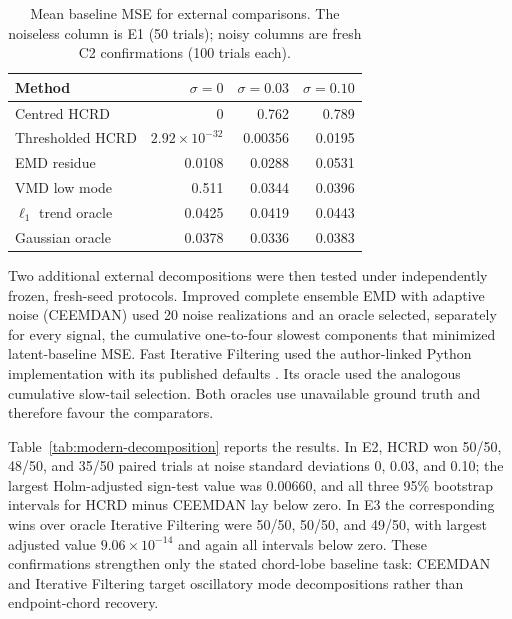 \begin{table}[H]
\centering
\caption{Mean baseline MSE for external comparisons.  The noiseless column is
E1 (50 trials); noisy columns are fresh C2 confirmations (100 trials each).}
\label{tab:external}
\begin{tabular}{lrrr}
\toprule
Method & $\sigma=0$ & $\sigma=0.03$ & $\sigma=0.10$ \\
\midrule
Centred HCRD & 0 & 0.762 & 0.789 \\
Thresholded HCRD & $2.92\times10^{-32}$ & 0.00356 & 0.0195 \\
EMD residue & 0.0108 & 0.0288 & 0.0531 \\
VMD low mode & 0.511 & 0.0344 & 0.0396 \\
$\ell_1$ trend oracle & 0.0425 & 0.0419 & 0.0443 \\
Gaussian oracle & 0.0378 & 0.0336 & 0.0383 \\
\bottomrule
\end{tabular}
\end{table}

Two additional external decompositions were then tested under independently
frozen, fresh-seed protocols.  Improved complete ensemble EMD with adaptive
noise (CEEMDAN) \citep{colominas2014ceemdan} used 20 noise realizations and an
oracle selected, separately for every signal, the cumulative one-to-four
slowest components that minimized latent-baseline MSE.  Fast Iterative
Filtering used the author-linked Python implementation with its published
defaults \citep{cicone2021fif}.  Its oracle used the analogous cumulative
slow-tail selection.  Both oracles use unavailable ground truth and therefore
favour the comparators.

Table~\ref{tab:modern-decomposition} reports the results.  In E2, HCRD won
50/50, 48/50, and 35/50 paired trials at noise standard deviations 0, 0.03,
and 0.10; the largest Holm-adjusted sign-test value was 0.00660, and all three
95\% bootstrap intervals for HCRD minus CEEMDAN lay below zero.  In E3 the
corresponding wins over oracle Iterative Filtering were 50/50, 50/50, and
49/50, with largest adjusted value $9.06\times10^{-14}$ and again all
intervals below zero.  These confirmations strengthen only the stated
chord-lobe baseline task: CEEMDAN and Iterative Filtering target oscillatory
mode decompositions rather than endpoint-chord recovery.

